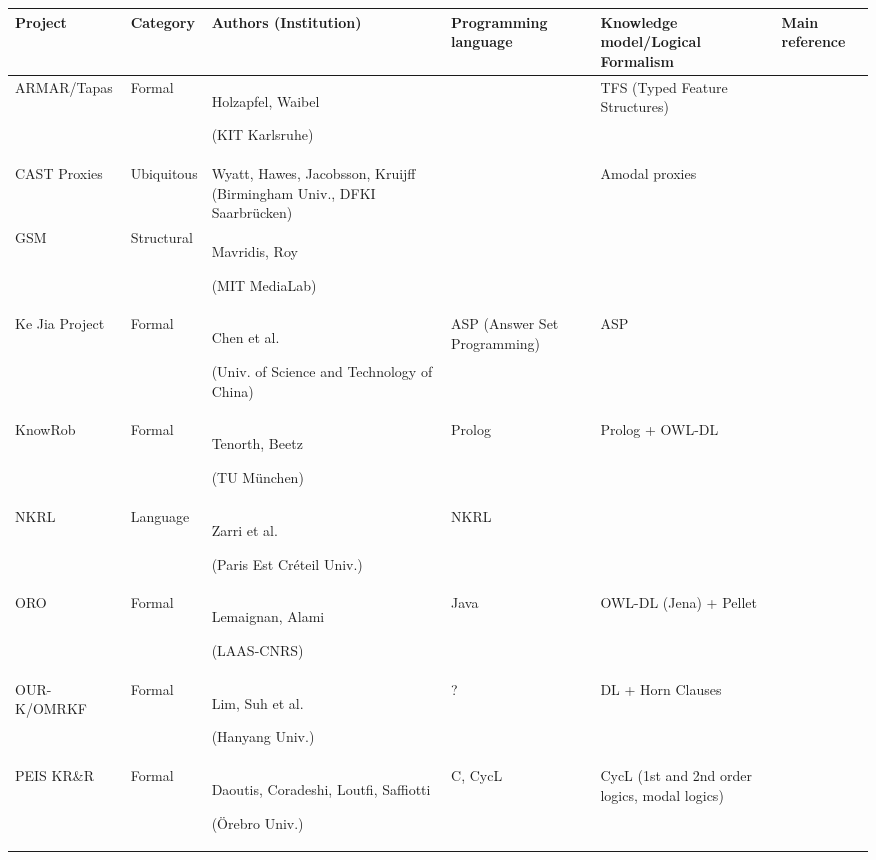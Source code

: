 \documentclass[journal]{IEEEtran}
\begin{document}
\begin{table*}\scriptsize
\begin{center}

\begin{tabular}{p{2.2cm}p{1.6cm}p{4cm}p{2.4cm}p{3.4cm}p{1.5cm}}
\toprule
{\bf Project} & {\bf Category} & {\bf Authors (Institution)} & {\bf Programming language} & {\bf Knowledge model/Logical Formalism} & Main reference \\
\midrule
ARMAR/Tapas & Formal & Holzapfel, Waibel \par (KIT Karlsruhe) & & TFS (Typed Feature Structures) & \cite{Holzapfel2008}\\
CAST Proxies & Ubiquitous & Wyatt, Hawes, Jacobsson, Kruijff (Birmingham Univ.,
DFKI Saarbrücken) & & Amodal proxies & \cite{jacobsson2008crossmodal} \\
GSM & Structural & Mavridis, Roy \par (MIT MediaLab) & & & \cite{Mavridis2006} \\
Ke Jia Project & Formal & Chen et al. \par (Univ. of Science and Technology of China) & ASP (Answer Set Programming) & ASP & \cite{Chen2010} \\
{\sc KnowRob} & Formal & Tenorth, Beetz \par (TU München) & {\sc Prolog} & {\sc Prolog} + OWL-DL &  \cite{Tenorth2009a} \\
NKRL & Language & Zarri et al. \par (Paris Est Créteil Univ.) & NKRL & & \cite{Sabri2011} \\
ORO & Formal & Lemaignan, Alami \par (LAAS-CNRS) & {\sc Java} & OWL-DL ({\sc Jena}) + {\sc Pellet} & \cite{Lemaignan2010} \\
OUR-K/OMRKF & Formal & Lim, Suh et al. \par (Hanyang Univ.) & ? & DL + Horn Clauses &  \cite{Lim2011, Suh2007} \\
PEIS KR\&R & Formal & Daoutis, Coradeshi, Loutfi, Saffiotti \par (Örebro Univ.) & {\sc C}, {\sc CycL} & CycL (1st and 2nd order logics, modal logics) & \cite{Daoutis2009} \\


\end{tabular}
\end{center}
\end{table*}
\end{document}
